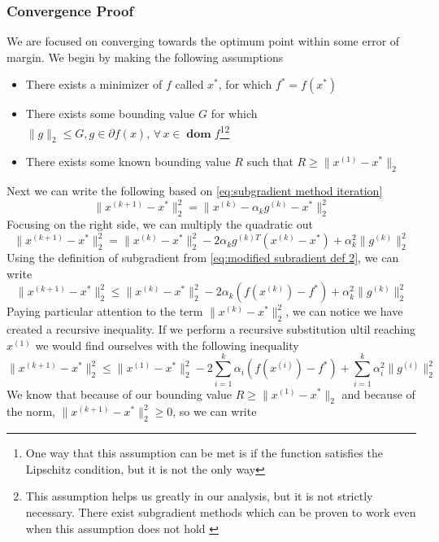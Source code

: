 \documentclass[journal,onecolumn]{IEEEtran}
\DeclareMathOperator{\dom}{\mathbf{dom}}
\let\oldforall\forall
\renewcommand{\forall}{ \, \oldforall \, }
\begin{document}
\subsubsection{Convergence Proof}
We are focused on converging towards the optimum point within some error of margin. We begin by making the following assumptions
\begin{itemize}
    \item There exists a minimizer of \(f\) called \(x^*\), for which \(f^* = f(x^*)\)
    \item There exists some bounding value \(G\) for which \(\|g\|_2 \leq G, g \in \partial f(x), \forall x \in \dom f\)\footnote{One way that this assumption can be met is if the function satisfies the Lipschitz condition, but it is not the only way}\footnote{This assumption helps us greatly in our analysis, but it is not strictly necessary. There exist subgradient methods which can be proven to work even when this assumption does not hold \cite{boydparksubgradients}}
    \item There exists some known bounding value \(R\) such that \(R \geq \|x^{(1)}-x^*\|_2\)
\end{itemize}
Next we can write the following based on \eqref{eq:subgradient method iteration}
\begin{equation}
\|x^{(k+1)}-x^*\|^2_2 = \|x^{(k)} - \alpha_k g^{(k)}-x^*\|^2_2
\end{equation}
Focusing on the right side, we can multiply the quadratic out
\begin{equation}
\|x^{(k+1)}-x^*\|^2_2= \|x^{(k)}-x^*\|^2_2 - 2\alpha_k g^{(k)T}(x^{(k)}-x^*) + \alpha^2_k \|g^{(k)}\|^2_2
\end{equation}
Using the definition of subgradient from \eqref{eq:modified subradient def 2}, we can write
\begin{equation}
\|x^{(k+1)}-x^*\|^2_2 \leq \|x^{(k)}-x^*\|^2_2 - 2\alpha_k (f(x^{(k)})-f^*) + \alpha^2_k \|g^{(k)}\|^2_2
\end{equation}
Paying particular attention to the term \(\|x^{(k)}-x^*\|^2_2\), we can notice we have created a recursive inequality. If we perform a recursive substitution ultil reaching \(x^{(1)}\) we would find ourselves with the following inequality
\begin{equation}
\|x^{(k+1)}-x^*\|^2_2 \leq \|x^{(1)}-x^*\|^2_2 - 2\sum^k_{i=1}\alpha_i (f(x^{(i)})-f^*) + \sum^k_{i=1}\alpha^2_i\|g^{(i)}\|^2_2
\end{equation}
We know that because of our bounding value \(R \geq \|x^{(1)}-x^*\|_2\) and because of the norm, \(\|x^{(k+1)}-x^*\|^2_2 \geq 0\), so we can write
\end{document}

